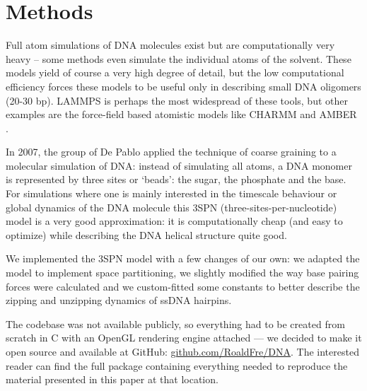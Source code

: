 \section{Methods}

Full atom simulations of DNA molecules exist but are computationally very heavy -- some methods even simulate the individual atoms of the solvent. These models yield of course a very high degree of detail, but the low computational efficiency forces these models to be useful only in describing small DNA oligomers (20-30 bp). LAMMPS \cite{plimpton2007lammps} is perhaps the most widespread of these tools, but other examples are the force-field based atomistic models like CHARMM \cite{brooks2009charmm} and AMBER \cite{cheatham1999modified}.

In 2007, the group of De Pablo \cite{knotts2007coarse} applied the technique of coarse graining to a molecular simulation of DNA: instead of simulating all atoms, a DNA monomer is represented by three sites or `beads': the sugar, the phosphate and the base. For simulations where one is mainly interested in the timescale behaviour or global dynamics of the DNA molecule this 3SPN (three-sites-per-nucleotide) model is a very good approximation: it is computationally cheap (and easy to optimize) while describing the DNA helical structure quite good. 

We implemented the 3SPN model with a few changes of our own: we adapted the model to implement space partitioning, we slightly modified the way base pairing forces were calculated and we custom-fitted some constants to better describe the zipping and unzipping dynamics of ssDNA hairpins.

The codebase was not available publicly, so everything had to be created from scratch in C with an OpenGL rendering engine attached --- we decided to make it open source and available at GitHub: \href{https://github.com/RoaldFre/DNA}{github.com/RoaldFre/DNA}. The interested reader can find the full package containing everything needed to reproduce the material presented in this paper at that location.












